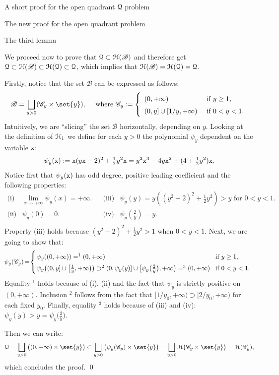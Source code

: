 \documentclass[11pt, a4paper, english, twoside, notitlepage, openright]{report}
\begin{document}
\begin{chapter}{A short proof for the open quadrant $\mathcal{Q}$ problem}
\begin{section}{The new proof for the open quadrant problem}
\begin{subsection}{The third lemma}
\begin{lemma}
\begin{Proof}
We proceed now to prove that $\mathcal{Q}\subset\mathcal{H}(\mathscr{B})$ and therefore get $\mathcal{Q}\subset\mathcal{H}(\mathscr{B})\subset\mathcal{H}(\mathcal{Q}) \subset\mathcal{Q}$, which implies that $\mathcal{H}(\mathscr{B})=\mathcal{H}(\mathcal{Q})=\mathcal{Q}$.

Firstly, notice that the set $\mathscr{B}$ can be expressed as follows:
$$
\mathscr{B}=\bigsqcup_{y>0}(\mathscr{C}_y\times\set{y}),\quad\text{ where } \mathscr{C}_y:= 
\left\{
\begin{array}{ll}
(0,+\infty)&\text{ if } y \ge 1,\\
(0,y]\cup[1/y,+\infty) & \text { if } 0<y<1.
\end{array}
\right.
$$
Intuitively, we are ``slicing'' the set $\mathscr{B}$ horizontally, depending on $y$. Looking at the definition of $\mathcal{H}_1$ we define for each $y>0$ the polynomial $\psi_y$ dependent on the variable ${\tt x}$:
$$
\psi_y({\tt x}):={\tt x}(y{\tt x}-2)^2+\tfrac{1}{2}y^2{\tt x}=y^2{\tt x}^3-4y{\tt x}^2+(4+\tfrac{1}{2}y^2){\tt x}.
$$
Notice first that $\psi_y({\tt x})$ has odd degree, positive leading coefficient and the following properties:
$$
\begin{array}{llcll}
\text{(i)}&\lim_{x\rightarrow+\infty}\psi_y(x)=+\infty. & &
\text{(iii)}&\psi_y(y)=y((y^2-2)^2+\tfrac{1}{2}y^2)>y\text{ for } 0<y<1.\\
\text{(ii)}&\psi_y(0)=0. & &
\text{(iv)}&\psi_y\left(\tfrac{2}{y}\right)=y.\\
\end{array}
$$
Property (iii) holds because $(y^2-2)^2+\tfrac{1}{2}y^2>1$ when $0<y<1$. Next, we are going to show that:
$$
\!\psi_y(\mathscr{C}_y) \!=\!
\left\{ \def\arraystretch{1.5}
\begin{array}{ll} 
\! \! \psi_y((0,+\infty))=^1(0,+\infty) & \!\!\! \text{ if } y \ge 1,\\
\! \! \psi_y\big((0,y]\cup \big[\frac{1}{y}, +\infty\big)\big) \supset^2 (0, \psi_y(y)] \cup \big[\psi_y\big(\tfrac{2}{y}\big),+\infty\big)=^3(0,+\infty)& \!\!\! \text{ if } 0<y<1.
\end{array}
\right.
$$
Equality $^1$ holds because of (i), (ii) and the fact that $\psi_y$ is strictly positive on $(0, +\infty)$. Inclusion $^2$  follows from the fact that $[1/y_0,+\infty)\supset[2/y_0,+\infty)$ for each fixed $y_0$. Finally, equality $^3$ holds because of (iii) and (iv): $\psi_y(y) > y = \psi_y\big(\tfrac{2}{y}\big)$.

Then we can write:
$$
\Qu=\bigsqcup_{y>0}\big((0,+\infty)\times\set{y}\big)\subset \bigsqcup_{y>0}\big(\psi_y(\mathscr{C}_y)\times\set{y}\big)= \bigsqcup_{y>0}\HH\big(\mathscr{C}_y\times\set{y}\big)=\HH(\mathscr{C}_y),
$$
which concludes the proof.
\qed
\end{Proof}
\end{lemma}
\end{subsection}


\end{section}
\end{chapter}
\end{document}

